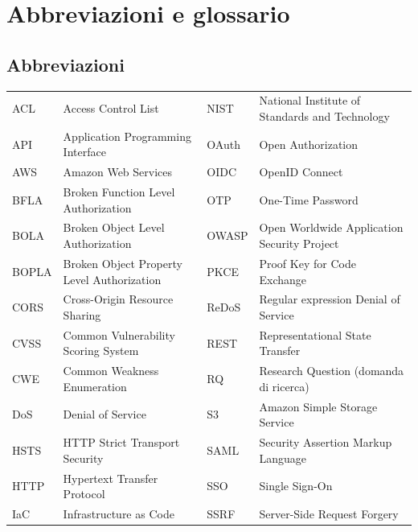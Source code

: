 \chapter*{Abbreviazioni e glossario}

\section*{Abbreviazioni}

{\footnotesize
\linespread{1.1}\selectfont
\setlength{\tabcolsep}{4pt}
\noindent
\begin{tabularx}{\linewidth}{@{}l >{\raggedright\arraybackslash}X @{\hspace{12pt}} l >{\raggedright\arraybackslash}X@{}}
  ACL   & Access Control List                         & NIST  & National Institute of Standards and Technology \\
  API   & Application Programming Interface           & OAuth & Open Authorization \\
  AWS   & Amazon Web Services                         & OIDC  & OpenID Connect \\
  BFLA  & Broken Function Level Authorization         & OTP   & One-Time Password \\
  BOLA  & Broken Object Level Authorization           & OWASP & Open Worldwide Application Security Project \\
  BOPLA & Broken Object Property Level Authorization  & PKCE  & Proof Key for Code Exchange \\
  CORS  & Cross-Origin Resource Sharing               & ReDoS & Regular expression Denial of Service \\
  CVSS  & Common Vulnerability Scoring System         & REST  & Representational State Transfer \\
  CWE   & Common Weakness Enumeration                 & RQ    & Research Question (domanda di ricerca) \\
  DoS   & Denial of Service                           & S3    & Amazon Simple Storage Service \\
  HSTS  & HTTP Strict Transport Security              & SAML  & Security Assertion Markup Language \\
  HTTP  & Hypertext Transfer Protocol                 & SSO   & Single Sign-On \\
  IaC   & Infrastructure as Code                      & SSRF  & Server-Side Request Forgery \\

\end{tabularx}}
